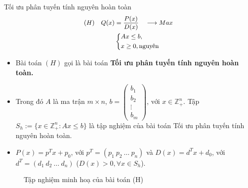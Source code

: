 \documentclass{beamer}
\begin{document}
\begin{frame}{Tối ưu phân tuyến tính nguyên hoàn toàn}
\begin{equation} \small
    \begin{split}
    (H) \quad Q(x) & = \frac{P(x)}{D(x)} \quad \longrightarrow Max \\
        & \left\{
        \begin{split}
        &Ax \leq  b, \\
        &x \geq 0, \text{nguyên} \\
        \end{split}
        \right.    
    \end{split}
\end{equation}            
\begin{itemize} \small
\item Bài toán $(H)$ gọi là bài toán \textbf{Tối ưu phân tuyến tính nguyên hoàn toàn.}
\item Trong đó $A$ là ma trận $m\times n$, $b=\begin{pmatrix}
    b_1 \\
    b_2 \\
    \vdots \\
    b_m
    \end{pmatrix}$, với $x\in \mathbb{Z}^n_+$. Tập $S_h:=\{x\in \mathbb{Z}^n_+: Ax\leq b\}$ là tập nghiệm của bài toán Tối ưu phân tuyến tính nguyên hoàn toàn. 
\item $P(x)=p^Tx+p_0$, với $p^T = (p_1 \: p_2 \: \ldots \: p_n)$ và $D(x)=d^Tx+d_0$, với $d^T = (d_1 \: d_2 \: \ldots \: d_n)$ ($D(x)>0, \forall x \in S_h$).
\end{itemize}
\end{frame}
\begin{frame}
\begin{figure}
    \caption{Tập nghiệm minh hoạ của bài toán (H)}
    \end{figure}
\end{frame}
\end{document}
